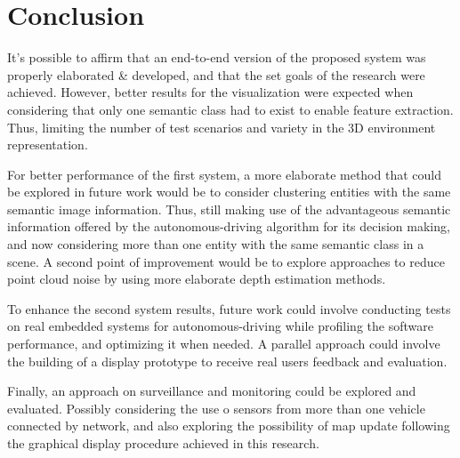 \chapter{Conclusion} \label{final_considerations}




It's possible to affirm that an end-to-end version of the proposed system was properly elaborated \& developed, and that the set goals of the research were achieved. However, better results for the visualization were expected when considering that only one semantic class had to exist to enable feature extraction. Thus, limiting the number of test scenarios and variety in the 3D environment representation.

For better performance of the first system, a more elaborate method that could be explored in future work would be to consider clustering entities with the same semantic image information. Thus, still making use of the advantageous semantic information offered by the autonomous-driving algorithm for its decision making, and now considering more than one entity with the same semantic class in a scene. A second point of improvement would be to explore approaches to reduce point cloud noise by using more elaborate depth estimation methods.

To enhance the second system results, future work could involve conducting tests on real embedded systems for autonomous-driving while profiling the software performance, and optimizing it when needed. A parallel approach could involve the building of a display prototype to receive real users feedback and evaluation. 

Finally, an approach on surveillance and monitoring could be explored and evaluated. Possibly considering the use o sensors from more than one vehicle connected by network, and also exploring the possibility of map update following the graphical display procedure achieved in this research.


